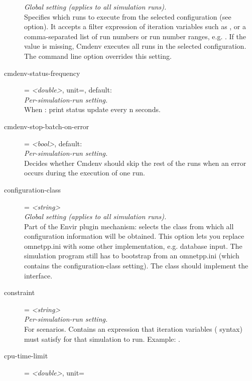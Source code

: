 \begin{description}
    \textit{Global setting (applies to all simulation runs).}\\
    Specifies which runs to execute from the selected configuration (see
     option). It accepts a
    filter expression of iteration variables such as , or
    a comma-separated list of run numbers or run number ranges, e.g.
    . If
    the value is missing, Cmdenv executes all runs in the selected
    configuration. The  command line option overrides this
    setting.
\item[cmdenv-status-frequency] = \textit{<double>}, unit=, default: \\
    \textit{Per-simulation-run setting.}\\
    When :
    print status update every n seconds.
\item[cmdenv-stop-batch-on-error] = \textit{<bool>}, default: \\
    \textit{Per-simulation-run setting.}\\
    Decides whether Cmdenv should skip the rest of the runs when an error
    occurs during the execution of one run.
\item[configuration-class] = \textit{<string>}\\
    \textit{Global setting (applies to all simulation runs).}\\
    Part of the Envir plugin mechanism: selects the class from which all
    configuration information will be obtained. This option lets you replace
    omnetpp.ini with some other implementation, e.g. database input. The
    simulation program still has to bootstrap from an omnetpp.ini (which
    contains the configuration-class setting). The class should implement the
     interface.
\item[constraint] = \textit{<string>}\\
    \textit{Per-simulation-run setting.}\\
    For scenarios. Contains an expression that iteration variables
    (\ttt{\$\{{\allowbreak}\}{\allowbreak}} syntax) must satisfy for that
    simulation to run. Example: .
\item[cpu-time-limit] = \textit{<double>}, unit=\\

\end{description}
